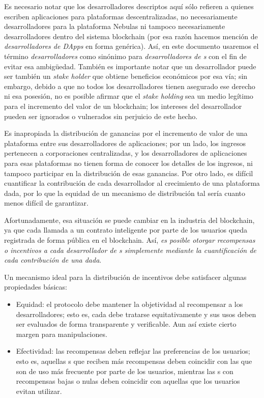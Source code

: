 Es necesario notar que los desarrolladores descriptos aquí sólo refieren a quienes escriben aplicaciones para plataformas descentralizadas, no necesariamente desarrolladores para la plataforma Nebulas ni tampoco necesariamente desarrolladores dentro del sistema blockchain (por esa razón hacemos mención de \textit{desarrolladores de DApps} en forma genérica). Así, en este documento usaremos el término \textit{desarrolladores} como sinónimo para \textit{desarrolladores de {\dapp}s} con el fin de evitar esa ambigüedad. También es importante notar que un desarrollador \dapp puede ser también un \textit{stake holder} que obtiene beneficios económicos por esa vía; sin embargo, debido a que no todos los desarrolladores tienen asegurado ese derecho ni esa posesión, no es posible afirmar que el \textit{stake holding} sea un medio legítimo para el incremento del valor de un blockchain; los intereses del desarrollador pueden ser ignorados o vulnerados sin perjuicio de este hecho.

Es inapropiada la distribución de ganancias por el incremento de valor de una plataforma entre sus desarrolladores de aplicaciones; por un lado, los ingresos pertenecen a corporaciones centralizadas, y los desarrolladores de aplicaciones para esas plataformas no tienen forma de conocer los detalles de los ingresos, ni tampoco participar en la distribución de esas ganancias. Por otro lado, es difícil cuantificar la contribución de cada desarrollador al crecimiento de una plataforma dada, por lo que la equidad de un mecanismo de distribución tal sería cuanto menos difícil de garantizar.

Afortunadamente, esa situación se puede cambiar en la industria del blockchain, ya que cada llamada a un contrato inteligente por parte de los usuarios queda registrada de forma pública en el blockchain. Así, \emph{es posible otorgar recompensas o incentivos a cada desarrollador de {\dapp}s simplemente mediante la cuantificación de cada contribución de una {\dapp} dada}.

Un mecanismo ideal para la distribución de incentivos debe satisfacer algunas propiedades básicas:

\begin{itemize}
	\item Equidad: el protocolo debe mantener la objetividad al recompensar a los desarrolladores; esto es, cada {\dapp} debe tratarse equitativamente y sus usos deben ser evaluados de forma transparente y verificable. Aun así existe cierto margen para manipulaciones.

	\item Efectividad: las recompensas deben reflejar las preferencias de los usuarios; esto es, aquellas {\dapp}s que reciben más recompensas deben coincidir con las que son de uso más frecuente por parte de los usuarios, mientras las {\dapp}s con recompensas bajas o nulas deben coincidir con aquellas que los usuarios evitan utilizar.
\end{itemize}

